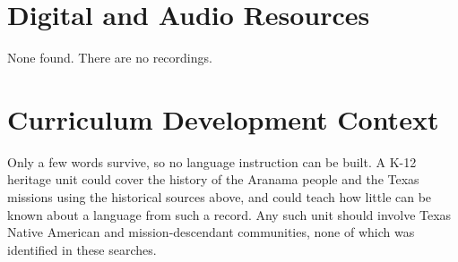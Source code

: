 \documentclass[12pt]{article}
\begin{document}
\section{Digital and Audio Resources}
None found. There are no recordings.

\section{Curriculum Development Context}
Only a few words survive, so no language instruction can be built. A K-12 heritage unit could cover the history of the Aranama people and the Texas missions using the historical sources above, and could teach how little can be known about a language from such a record. Any such unit should involve Texas Native American and mission-descendant communities, none of which was identified in these searches.
\end{document}
